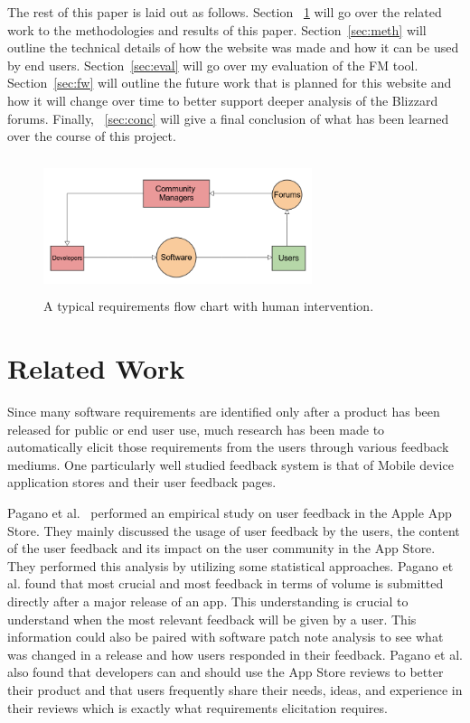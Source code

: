\documentclass[conference]{IEEEtran}
\begin{document}
The rest of this paper is laid out as follows. Section ~\ref{sec:related} will go over the related work to 
the methodologies and results of this paper. Section~\ref{sec:meth} will outline the technical details
of how the website was made and how it can be used by end users. Section~\ref{sec:eval} will go over
my evaluation of the FM tool. Section~\ref{sec:fw} will outline
the future work that is planned for this website and how it will change over time to better support
deeper analysis of the Blizzard forums. Finally, ~\ref{sec:conc} will give a final conclusion of what has 
been learned over the course of this project.

\begin{figure}[tb!]
\centering
\includegraphics[width=0.7\textwidth, height=150px]{images/requirements.png}
\caption{A typical requirements flow chart with human intervention.\label{fig:requirements1}}
\end{figure}

\section{Related Work}
\label{sec:related}

Since many software requirements are identified only after a product has been released for public
or end user use, much research has been made to automatically elicit those requirements from the
users through various feedback mediums. One particularly well studied feedback system is that of
Mobile device application stores and their user feedback pages.

Pagano et al.~\cite{Pagano:2013:FAS} performed an empirical study on user feedback in the Apple
App Store. They mainly discussed the usage of user feedback by the users, the content of the user
feedback and its impact on the user community in the App Store. They performed this analysis by
utilizing some statistical approaches. Pagano et al. found that most crucial and most feedback
in terms of volume is submitted directly after a major release of an app. This understanding
is crucial to understand when the most relevant feedback will be given by a user. This information
could also be paired with software patch note analysis to see what was changed in a release and
how users responded in their feedback. Pagano et al. also found that developers can and should
use the App Store reviews to better their product and that users frequently share their needs,
ideas, and experience in their reviews which is exactly what requirements elicitation requires.
\end{document}
